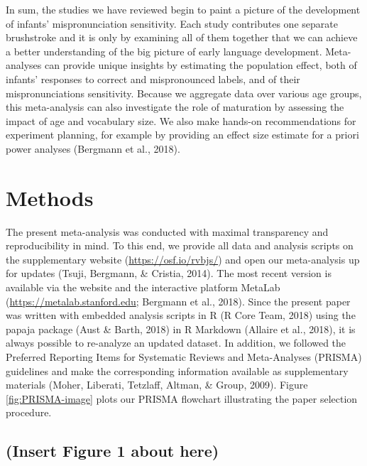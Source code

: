 \documentclass[man]{apa6}
\theoremstyle{definition}
\theoremstyle{definition}
\theoremstyle{definition}
\theoremstyle{remark}
\begin{document}
In sum, the studies we have reviewed begin to paint a picture of the
development of infants' mispronunciation sensitivity. Each study
contributes one separate brushstroke and it is only by examining all of
them together that we can achieve a better understanding of the big
picture of early language development. Meta-analyses can provide unique
insights by estimating the population effect, both of infants' responses
to correct and mispronounced labels, and of their mispronunciations
sensitivity. Because we aggregate data over various age groups, this
meta-analysis can also investigate the role of maturation by assessing
the impact of age and vocabulary size. We also make hands-on
recommendations for experiment planning, for example by providing an
effect size estimate for a priori power analyses (Bergmann et al.,
2018).

\section{Methods}\label{methods}

The present meta-analysis was conducted with maximal transparency and
reproducibility in mind. To this end, we provide all data and analysis
scripts on the supplementary website (\url{https://osf.io/rvbjs/}) and
open our meta-analysis up for updates (Tsuji, Bergmann, \& Cristia,
2014). The most recent version is available via the website and the
interactive platform MetaLab (\url{https://metalab.stanford.edu};
Bergmann et al., 2018). Since the present paper was written with
embedded analysis scripts in R (R Core Team, 2018) using the papaja
package (Aust \& Barth, 2018) in R Markdown (Allaire et al., 2018), it
is always possible to re-analyze an updated dataset. In addition, we
followed the Preferred Reporting Items for Systematic Reviews and
Meta-Analyses (PRISMA) guidelines and make the corresponding information
available as supplementary materials (Moher, Liberati, Tetzlaff, Altman,
\& Group, 2009). Figure \ref{fig:PRISMA-image} plots our PRISMA
flowchart illustrating the paper selection procedure.

\subsection{(Insert Figure 1 about
here)}\label{insert-figure-1-about-here}
\end{document}
